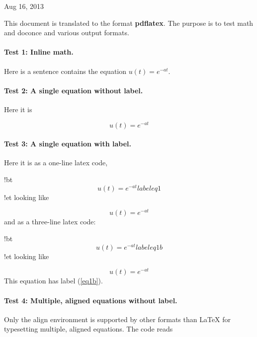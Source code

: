 \documentclass[%
oneside,                 %
final,                   %
10pt]{article}
\begin{document}
\begin{center}
Aug 16, 2013
\end{center}

\vspace{1cm}



This document is translated to the format \textbf{pdflatex}. The purpose is to
test math and doconce and various output formats.

\paragraph{Test 1: Inline math.}
Here is a sentence contains the equation $u(t)=e^{-at}$.

\paragraph{Test 2: A single equation without label.}
Here it is

\[ u(t)=e^{-at} \]

\paragraph{Test 3: A single equation with label.}
Here it is as a one-line
latex code,

\bccq
!bt
\begin{equation} u(t)=e^{-at} label{eq1}\end{equation}
!et
\eccq
looking like

\begin{equation} u(t)=e^{-at} \label{eq1}\end{equation}
and as a three-line latex code:

\bccq
!bt
\begin{equation}
u(t)=e^{-at} label{eq1b}
\end{equation}
!et
\eccq
looking like

\begin{equation}
u(t)=e^{-at} \label{eq1b}
\end{equation}
This equation has label (\ref{eq1b}).


\paragraph{Test 4: Multiple, aligned equations without label.}
Only the align
environment is supported by other formats than {\LaTeX} for typesetting
multiple, aligned equations. The code reads
\end{document}
